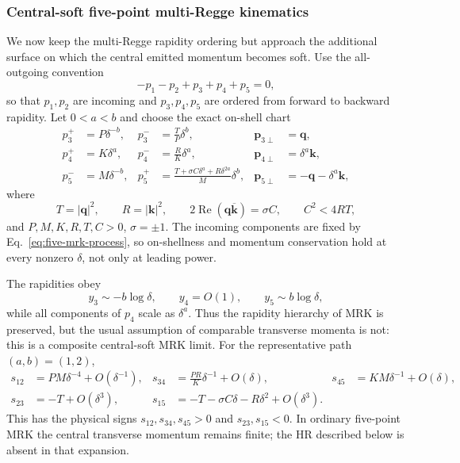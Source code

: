 \documentclass[a4paper,11pt]{article}
\begin{document}
\iffalse
\subsubsection{Central-soft five-point multi-Regge kinematics}
\label{sec:five-point-central-soft-mrk}

We now keep the multi-Regge rapidity ordering but approach the additional
surface on which the central emitted momentum becomes soft.  Use the
all-outgoing convention
\begin{equation}
 -p_1-p_2+p_3+p_4+p_5=0,
 \label{eq:five-mrk-process}
\end{equation}
so that \(p_1,p_2\) are incoming and \(p_3,p_4,p_5\) are ordered from forward
to backward rapidity.  Let \(0<a<b\) and choose the exact on-shell chart
\begin{align}
 p_3^+&=P\delta^{-b},&
 p_3^-&=\frac{T}{P}\delta^b,&
 \boldsymbol p_{3\perp}&=\boldsymbol q,
 \nonumber\\
 p_4^+&=K\delta^a,&
 p_4^-&=\frac{R}{K}\delta^a,&
 \boldsymbol p_{4\perp}&=\delta^a\boldsymbol k,
 \nonumber\\
 p_5^-&=M\delta^{-b},&
 p_5^+&=\frac{T+\sigma C\delta^a+R\delta^{2a}}{M}\delta^b,&
 \boldsymbol p_{5\perp}&=-\boldsymbol q-\delta^a\boldsymbol k,
 \label{eq:five-mrk-chart}
\end{align}
where
\begin{equation}
 T=|\boldsymbol q|^2,\qquad R=|\boldsymbol k|^2,\qquad
 2\operatorname{Re}(\boldsymbol q\overline{\boldsymbol k})=\sigma C,
 \qquad C^2<4RT,
 \label{eq:five-mrk-domain}
\end{equation}
and \(P,M,K,R,T,C>0\), \(\sigma=\pm1\).  The incoming components are fixed by
Eq.~\eqref{eq:five-mrk-process}, so on-shellness and momentum conservation
hold at every nonzero \(\delta\), not only at leading power.

The rapidities obey
\begin{equation}
 y_3\sim-b\log\delta,\qquad y_4=O(1),\qquad
 y_5\sim b\log\delta,
 \label{eq:five-mrk-rapidities}
\end{equation}
while all components of \(p_4\) scale as \(\delta^a\).  Thus the rapidity
hierarchy of MRK is preserved, but the usual assumption of comparable
transverse momenta is not: this is a composite central-soft MRK limit.
For the representative path \((a,b)=(1,2)\),
\begin{align}
 s_{12}&=PM\delta^{-4}+O(\delta^{-1}),&
 s_{34}&=\frac{PR}{K}\delta^{-1}+O(\delta),&
 s_{45}&=KM\delta^{-1}+O(\delta),
 \nonumber\\
 s_{23}&=-T+O(\delta^3),&
 s_{15}&=-T-\sigma C\delta-R\delta^2+O(\delta^3).
 \label{eq:five-mrk-invariants}
\end{align}
This has the physical signs \(s_{12},s_{34},s_{45}>0\) and
\(s_{23},s_{15}<0\).  In ordinary five-point MRK the central transverse
momentum remains finite; the HR described below is absent in that expansion.
\end{document}
